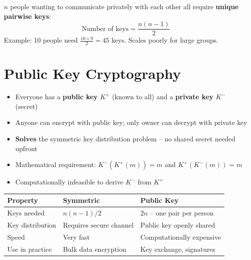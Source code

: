 \begin{tcolorbox}[warnbox, title=Symmetric Key Problem]
$n$ people wanting to communicate privately with each other all require \textbf{unique pairwise keys}:
\[ \text{Number of keys} = \frac{n(n-1)}{2} \]
Example: 10 people need $\frac{10 \times 9}{2} = 45$ keys. Scales poorly for large groups.
\end{tcolorbox}

\section{Public Key Cryptography}

\begin{tcolorbox}[keybox, title=Public Key Cryptography -- Key Idea]
\begin{itemize}[noitemsep]
  \item Everyone has a \textbf{public key} $K^+$ (known to all) and a \textbf{private key} $K^-$ (secret)
  \item Anyone can encrypt with public key; only owner can decrypt with private key
  \item \textbf{Solves} the symmetric key distribution problem -- no shared secret needed upfront
  \item Mathematical requirement: $K^-(K^+(m)) = m$ and $K^+(K^-(m)) = m$
  \item Computationally infeasible to derive $K^-$ from $K^+$
\end{itemize}
\end{tcolorbox}

\begin{imagebox}
\end{imagebox}

\begin{tcolorbox}[warnbox, title=Key Difference -- Symmetric vs.\ Public Key]
\begin{tabular}{lll}
\toprule
\textbf{Property} & \textbf{Symmetric} & \textbf{Public Key} \\
\midrule
Keys needed & $n(n-1)/2$ & $2n$ -- one pair per person \\
Key distribution & Requires secure channel & Public key openly shared \\
Speed & Very fast & Computationally expensive \\
Use in practice & Bulk data encryption & Key exchange, signatures \\
\bottomrule
\end{tabular}
\end{tcolorbox}

